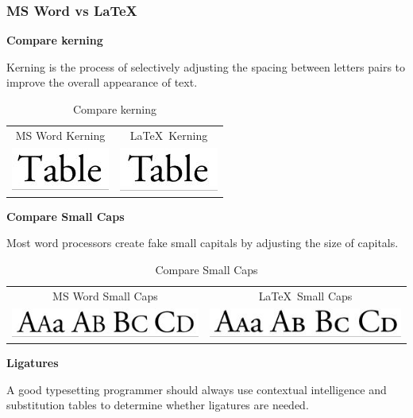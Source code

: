 \documentclass[11pt]{article}
\begin{document}
\subsubsection{MS Word vs \LaTeX\ }
\textbf{Compare kerning}

Kerning is the process of selectively adjusting the spacing between letters pairs to improve the overall appearance of text. 

\begin{table}[ht]
\centering
\begin{tabular}{cc}
MS Word Kerning & \LaTeX\ Kerning \\
\includegraphics[scale=1]{img/kerning_word}&\includegraphics[scale=1]{img/kerning_latex}\\
\end{tabular}
\label{tab:gt}
\caption{Compare kerning}
\end{table}

\textbf{Compare Small Caps}

Most word processors create fake small capitals by adjusting the size of capitals.

\begin{table}[ht]
\centering
\begin{tabular}{cc}
MS Word Small Caps & \LaTeX\ Small Caps \\
\includegraphics[scale=0.6]{img/sc_word}&\includegraphics[scale=0.6]{img/sc_latex}\\
\end{tabular}
\label{tab:gt}
\caption{Compare Small Caps}
\end{table}

\textbf{Ligatures}

A good typesetting programmer should always use contextual intelligence and substitution tables to determine whether ligatures are needed. 
\end{document}
